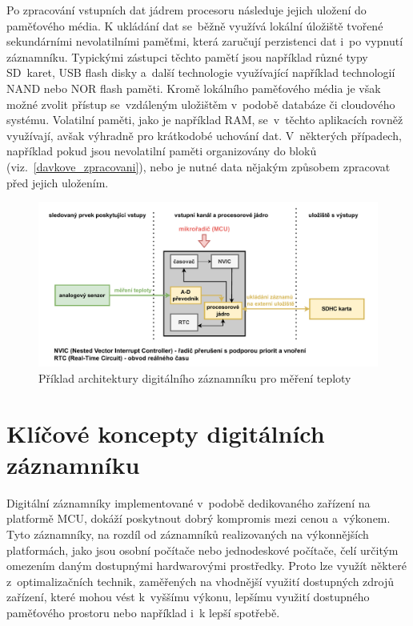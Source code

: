 Po zpracování vstupních dat jádrem procesoru následuje jejich uložení do paměťového média. K ukládání dat se~běžně využívá lokální úložiště tvořené sekundárními nevolatilními paměťmi, která zaručují perzistenci dat i~po vypnutí záznamníku. Typickými zástupci těchto pamětí jsou například různé typy SD~karet, USB flash disky a~další technologie využívající například technologií NAND nebo NOR flash paměti. Kromě lokálního paměťového média je však možné zvolit přístup se~vzdáleným uložištěm v~podobě databáze či cloudového systému. Volatilní paměti, jako je například RAM, se~v~těchto aplikacích rovněž využívají, avšak výhradně pro krátkodobé uchování dat. V~některých případech, například pokud jsou nevolatilní paměti organizovány do bloků (viz.~\ref{davkove_zpracovani}), nebo je nutné data nějakým způsobem zpracovat před jejich uložením.~\cite{datalogger_sd_mmc_usb_flash_disk, ieee_digital_sound_recorder_arm_sd_card}

\begin{figure}[h]
    \centering
    \includegraphics[width=1.00\textwidth]{obrazky-figures/recorder_mcu-w-legend.pdf}
    
    \caption{Příklad architektury digitálního záznamníku pro měření teploty}
    \label{fig:mcu-recorder}
\end{figure}

\newpage

\section{Klíčové koncepty digitálních záznamníku} 
\label{klicove_koncepty_digitalnich_zaznamniku}
Digitální záznamníky implementované v~podobě dedikovaného zařízení na platformě MCU, dokáží poskytnout dobrý kompromis mezi cenou a~výkonem. Tyto záznamníky, na rozdíl od záznamníků realizovaných na výkonnějších platformách, jako jsou osobní počítače nebo jednodeskové počítače, čelí určitým omezením daným dostupnými hardwarovými prostředky. Proto lze využít některé z~optimalizačních technik, zaměřených na vhodnější využití dostupných zdrojů zařízení, které mohou vést k~vyššímu výkonu, lepšímu využití dostupného paměťového prostoru nebo například i~k lepší spotřebě.


